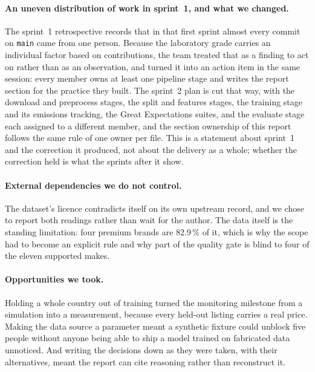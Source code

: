 \paragraph{An uneven distribution of work in sprint~1, and what we changed.}
The sprint~1 retrospective records that in that first sprint almost every commit on \texttt{main} came from one person.
Because the laboratory grade carries an individual factor based on contributions, the team treated that as a finding to act on rather than as an observation, and turned it into an action item in the same session: every member owns at least one pipeline stage and writes the report section for the practice they built.
The sprint~2 plan is cut that way, with the download and preprocess stages, the split and features stages, the training stage and its emissions tracking, the Great Expectations suites, and the evaluate stage each assigned to a different member, and the section ownership of this report follows the same rule of one owner per file.
This is a statement about sprint~1 and the correction it produced, not about the delivery as a whole; whether the correction held is what the sprints after it show.

\paragraph{External dependencies we do not control.}
The dataset's licence contradicts itself on its own upstream record, and we chose to report both readings rather than wait for the author.
The data itself is the standing limitation: four premium brands are 82.9\,\% of it, which is why the scope had to become an explicit rule and why part of the quality gate is blind to four of the eleven supported makes.

\paragraph{Opportunities we took.}
Holding a whole country out of training turned the monitoring milestone from a simulation into a measurement, because every held-out listing carries a real price.
Making the data source a parameter meant a synthetic fixture could unblock five people without anyone being able to ship a model trained on fabricated data unnoticed.
And writing the decisions down as they were taken, with their alternatives, meant the report can cite reasoning rather than reconstruct it.

